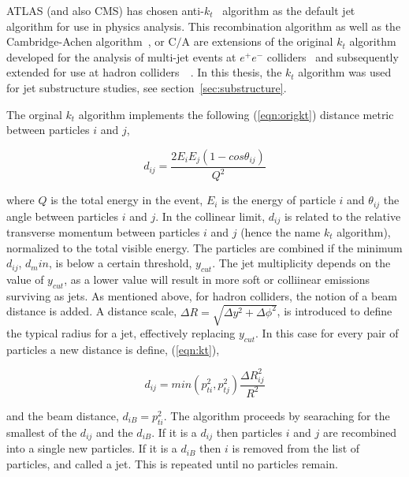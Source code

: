 ATLAS (and also CMS) has chosen anti-$k_t$~\cite{antiktalg} algorithm as the default jet algorithm for use in physics analysis.  This recombination algorithm as well as the Cambridge-Achen algorithm~\cite{CamAchen}, or C$/$A are extensions of the original $k_t$ algorithm developed for the analysis of multi-jet events at $e^+ e^-$ colliders~\cite{JADE} and subsequently extended for use at hadron colliders~\cite{kt2}~\cite{kt1}. In this thesis, the $k_t$ algorithm was used for jet substructure studies, see section~\ref{sec:substructure}.

The orginal $k_t$ algorithm implements the following (\ref{eqn:origkt}) distance metric between particles $i$ and $j$,

\begin{equation} 
d_{ij} = \frac{2E_i E_j (1-cos\theta_{ij}) }{Q^2}
\label{eqn:origkt}
\end{equation}

where $Q$ is the total energy in the event, $E_i$ is the energy of particle $i$ and $\theta_{ij}$ the angle between particles $i$ and $j$. In the collinear limit, $d_{ij}$ is related to the relative transverse momentum between particles $i$ and $j$ (hence the name $k_t$ algorithm), normalized to the total visible energy.
The particles are combined if the minimum $d_{ij}$, $d_min$, is below a certain threshold, $y_{cut}$.  The jet multiplicity depends on the value of $y_{cut}$, as a lower value will result in more soft or colliinear emissions surviving as jets. %
As mentioned above, for hadron colliders, the notion of a beam distance is added. A distance scale, $\Delta R = \sqrt{\Delta y^2 +\Delta \phi^2}$, is introduced to define the typical radius for a jet, effectively replacing $y_{cut}$. In this case for every pair of particles a new distance is define, (\ref{eqn:kt}),

\begin{equation} 
d_{ij} = min(p^2_{ti},p^2_{tj}) \frac{\Delta R^2_{ij}}{R^2}
\label{eqn:kt}
\end{equation}

and the beam distance, $d_{iB}=p^2_{ti}$. %
The algorithm proceeds by searaching for the smallest of the $d_{ij}$ and the $d_{iB}$. If it is a $d_{ij}$ then particles $i$ and $j$ are recombined into a single new particles. If it is a $d_{iB}$ then $i$ is removed from the list of particles, and called a jet. This is repeated until no particles remain.

